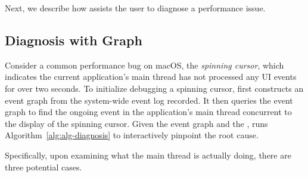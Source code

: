 Next, we describe how \xxx assists the user to diagnose a performance issue.


\subsection{Diagnosis with Graph}\label{subsec:debug}



Consider a common performance bug on macOS, the \emph{spinning cursor}, which
indicates the current application's main thread has not processed any UI
events for over two seconds. To initialize debugging a spinning cursor, \xxx
first constructs an event graph from the system-wide event log recorded. It
then queries the event graph to find the ongoing event in the application's
main thread concurrent to the display of the spinning cursor. Given the event
graph and the \spinningnode, \xxx runs Algorithm~\ref{alg:alg-diagnosis} to
interactively pinpoint the root cause.

Specifically, upon examining what the main thread is actually doing, there
are three potential cases.

